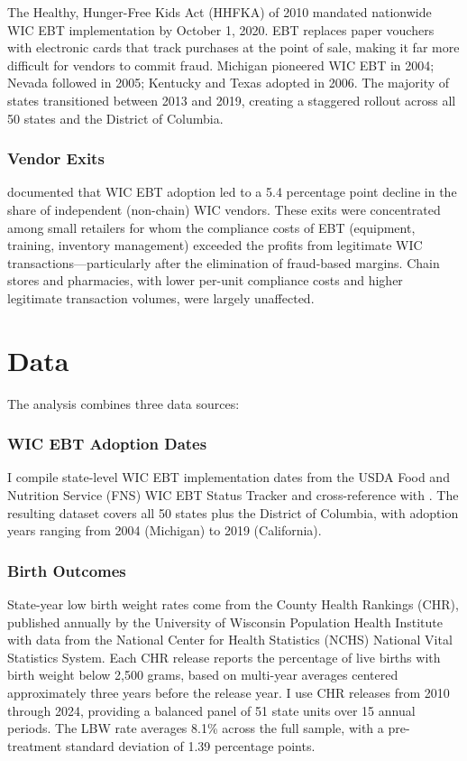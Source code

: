 \documentclass[12pt]{article}
\begin{document}
The Healthy, Hunger-Free Kids Act (HHFKA) of 2010 mandated nationwide WIC EBT implementation by October 1, 2020. EBT replaces paper vouchers with electronic cards that track purchases at the point of sale, making it far more difficult for vendors to commit fraud. Michigan pioneered WIC EBT in 2004; Nevada followed in 2005; Kentucky and Texas adopted in 2006. The majority of states transitioned between 2013 and 2019, creating a staggered rollout across all 50 states and the District of Columbia.

\subsubsection*{Vendor Exits} \citet{meckel2020} documented that WIC EBT adoption led to a 5.4 percentage point decline in the share of independent (non-chain) WIC vendors. These exits were concentrated among small retailers for whom the compliance costs of EBT (equipment, training, inventory management) exceeded the profits from legitimate WIC transactions---particularly after the elimination of fraud-based margins. Chain stores and pharmacies, with lower per-unit compliance costs and higher legitimate transaction volumes, were largely unaffected.

\section{Data}

The analysis combines three data sources:

\subsubsection*{WIC EBT Adoption Dates} I compile state-level WIC EBT implementation dates from the USDA Food and Nutrition Service (FNS) WIC EBT Status Tracker and cross-reference with \citet{meckel2020}. The resulting dataset covers all 50 states plus the District of Columbia, with adoption years ranging from 2004 (Michigan) to 2019 (California).

\subsubsection*{Birth Outcomes} State-year low birth weight rates come from the County Health Rankings (CHR), published annually by the University of Wisconsin Population Health Institute with data from the National Center for Health Statistics (NCHS) National Vital Statistics System. Each CHR release reports the percentage of live births with birth weight below 2,500 grams, based on multi-year averages centered approximately three years before the release year. I use CHR releases from 2010 through 2024, providing a balanced panel of 51 state units over 15 annual periods. The LBW rate averages 8.1\% across the full sample, with a pre-treatment standard deviation of 1.39 percentage points.
\end{document}
